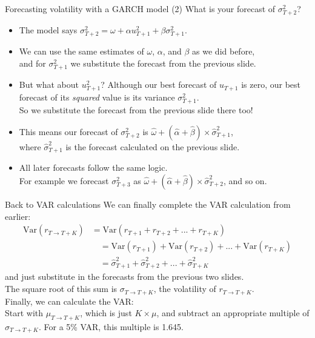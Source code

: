 \documentclass[t,12pt]{beamer}
\begin{document}
\begin{frame}[c]{Forecasting volatility with a GARCH model (2)}
What is your forecast of $\sigma_{T+2}^2$?
\begin{itemize}
\smallskip
\item The model says $\sigma_{T+2}^2 = \omega + \alpha u_{T+1}^2 + \beta \sigma_{T+1}^2$.
\smallskip
\item We can use the same estimates of $\omega$, $\alpha$, and $\beta$ as we did before, 
\\ and for $\sigma_{T+1}^2$ we substitute the forecast from the previous slide.
\smallskip
\item But what about $u_{T+1}^2$? Although our best forecast of $u_{T+1}$ is zero, our best forecast of its \emph{squared} value is its variance $\sigma_{T+1}^2$.
\\ So we substitute the forecast from the previous slide there too!
\smallskip
\item This means our forecast of $\sigma_{T+2}^2$ is $\hat{\omega} + (\hat{\alpha} + \hat{\beta}) \times \hat{\sigma}_{T+1}^2$,
\\ where $\hat{\sigma}_{T+1}^2$ is the forecast calculated on the previous slide.
\smallskip
\item All later forecasts follow the same logic. 
\\ For example we forecast $\sigma_{T+3}^2$ as $\hat{\omega} + (\hat{\alpha} + \hat{\beta}) \times \hat{\sigma}_{T+2}^2$, and so on.
\end{itemize}
\end{frame}

\begin{frame}[c]{Back to VAR calculations}
We can finally complete the VAR calculation from earlier:
\begin{align*}
\text{Var}(r_{T \to T+K}) &= \text{Var}(r_{T+1} + r_{T+2} + ... + r_{T+K})
\\ &\quad = \text{Var}(r_{T+1}) + \text{Var}(r_{T+2}) + ... + \text{Var}(r_{T+K})
\\ &\quad = \hat{\sigma}_{T+1}^2 + \hat{\sigma}_{T+2}^2 + ... + \hat{\sigma}_{T+K}^2
\end{align*}
and just substitute in the forecasts from the previous two slides.
\\ 
The square root of this sum is $\sigma_{T \to T+K}$, the volatility of $r_{T \to T+K}$.
\\ \medskip
Finally, we can calculate the VAR: 
\\ \medskip 
Start with $\mu_{T \to T+K}$, which is just $K \times \mu$, and subtract an appropriate multiple of $\sigma_{T \to T+K}$. 
For a 5\% VAR, this multiple is 1.645.
\end{frame}
\end{document}
